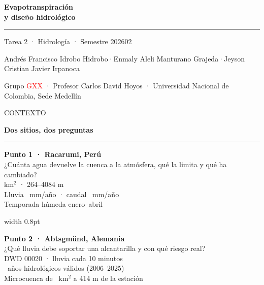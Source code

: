 \documentclass[12pt]{article}
\newcommand{\slide}[2]{\newpage
  {\footnotesize\color{tenue}\MakeUppercase{#1}}\par\vspace{2pt}
  {\color{acento}\LARGE\bfseries #2}\par\vspace{4pt}
  {\color{acento}\rule{\linewidth}{0.8pt}}\par\vspace{0.35cm}}
\renewcommand{\Large}{\fontsize{19}{24}\selectfont}
\renewcommand{\large}{\fontsize{16}{20}\selectfont}
\begin{document}
\thispagestyle{empty}
\vspace*{1.8cm}
{\color{acento}\fontsize{32}{38}\selectfont\bfseries Evapotranspiración\\[4pt] y diseño hidrológico}\par
\vspace{0.4cm}
{\color{acento}\rule{0.5\linewidth}{1.2pt}}\par\vspace{0.5cm}
{\Large Tarea 2 · Hidrología · Semestre 202602}\par\vspace{0.9cm}
{\large Andrés Francisco Idrobo Hidrobo\quad·\quad Enmaly Aleli Manturano Grajeda\quad·\quad Jeyson Cristian Javier Irpanoca}\par\vspace{0.25cm}
{\large\color{tenue} Grupo \textcolor{red}{GXX} · Profesor Carlos David Hoyos · Universidad Nacional de Colombia, Sede Medellín}

\slide{Contexto}{Dos sitios, dos preguntas}
\begin{minipage}[t]{0.47\linewidth}
{\color{acento}\Large\bfseries Punto 1 · Racarumi, Perú}\\[6pt]
\Large ¿Cuánta agua devuelve la cuenca a la atmósfera, qué la limita y qué ha cambiado?\\[12pt]
\large 2363 km$^2$ · 264--4084 m\\
Lluvia \PL\ mm/año · caudal \Qmed\ mm/año\\
Temporada húmeda enero--abril
\end{minipage}\hfill
{\color{acento}\vrule width 0.8pt}\hfill
\begin{minipage}[t]{0.47\linewidth}
{\color{acento}\Large\bfseries Punto 2 · Abtsgmünd, Alemania}\\[6pt]
\Large ¿Qué lluvia debe soportar una alcantarilla y con qué riesgo real?\\[12pt]
\large DWD 00020 · lluvia cada 10 minutos\\
\NAnios\ años hidrológicos válidos (2006--2025)\\
Microcuenca de \AreaMicro\ km$^2$ a 414 m de la estación
\end{minipage}
\end{document}
